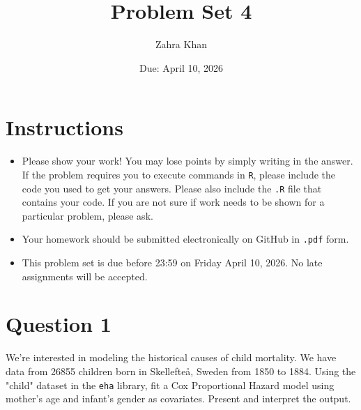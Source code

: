 \documentclass[12pt,letterpaper]{article}
\title{Problem Set 4}
\date{Due: April 10, 2026}
\author{Zahra Khan}
\begin{document}
	\maketitle
	\section*{Instructions}
	\begin{itemize}
	\item Please show your work! You may lose points by simply writing in the answer. If the problem requires you to execute commands in \texttt{R}, please include the code you used to get your answers. Please also include the \texttt{.R} file that contains your code. If you are not sure if work needs to be shown for a particular problem, please ask.
	\item Your homework should be submitted electronically on GitHub in \texttt{.pdf} form.
	\item This problem set is due before 23:59 on Friday April 10, 2026. No late assignments will be accepted.

	\end{itemize}

	\vspace{.25cm}
\section*{Question 1}
\vspace{.25cm}
\noindent We're interested in modeling the historical causes of child mortality. We have data from 26855 children born in Skellefteå, Sweden from 1850 to 1884. Using the "child" dataset in the \texttt{eha} library, fit a Cox Proportional Hazard model using mother's age and infant's gender as covariates. Present and interpret the output.
\end{document}
